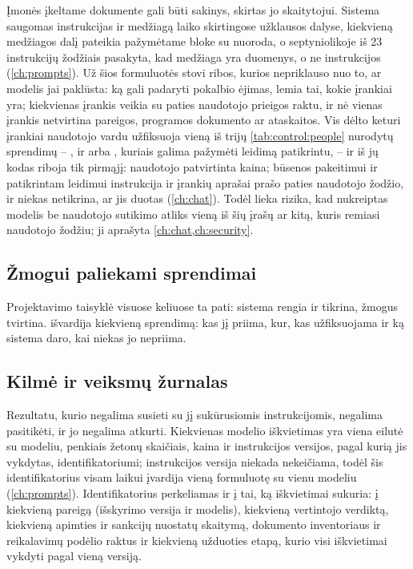 Įmonės įkeltame dokumente gali būti sakinys, skirtas jo skaitytojui. Sistema saugomas
instrukcijas ir medžiagą laiko skirtingose užklausos dalyse, kiekvieną medžiagos dalį
pateikia pažymėtame bloke su nuoroda, o septyniolikoje iš 23 instrukcijų žodžiais pasakyta,
kad medžiaga yra duomenys, o ne instrukcijos (\cref{ch:prompts}). Už šios formuluotės
stovi ribos, kurios nepriklauso nuo to, ar modelis jai paklūsta: ką gali padaryti pokalbio
ėjimas, lemia tai, kokie įrankiai yra; kiekvienas įrankis veikia su paties naudotojo
prieigos raktu, ir nė vienas įrankis netvirtina pareigos, programos dokumento ar ataskaitos.
Vis dėlto keturi įrankiai naudotojo vardu užfiksuoja vieną iš trijų \cref{tab:control:people}
nurodytų sprendimų -- ,  ir
 arba , kuriais galima pažymėti leidimą patikrintu,
-- ir iš jų kodas riboja tik pirmąjį:
naudotojo patvirtinta kaina; būsenos pakeitimui ir patikrintam leidimui instrukcija ir įrankių
aprašai prašo paties naudotojo žodžio, ir niekas netikrina, ar jis duotas (\cref{ch:chat}).
Todėl lieka rizika, kad nukreiptas modelis be
naudotojo sutikimo atliks vieną iš šių įrašų ar kitą, kuris remiasi naudotojo žodžiu; ji
aprašyta \cref{ch:chat,ch:security}.

\subsection{Žmogui paliekami sprendimai}

Projektavimo taisyklė visuose keliuose ta pati: sistema rengia ir tikrina, žmogus tvirtina.
 išvardija kiekvieną sprendimą: kas jį priima, kur, kas
užfiksuojama ir ką sistema daro, kai niekas jo nepriima.

\subsection{Kilmė ir veiksmų žurnalas}\label{sec:control:provenance}

Rezultatu, kurio negalima susieti su jį sukūrusiomis instrukcijomis, negalima pasitikėti, ir
jo negalima atkurti. Kiekvienas modelio iškvietimas yra viena  eilutė su
modeliu, penkiais žetonų skaičiais, kaina ir instrukcijos versijos, pagal kurią jis vykdytas,
identifikatoriumi; instrukcijos versija niekada nekeičiama, todėl šis identifikatorius visam
laikui įvardija vieną formuluotę su vienu modeliu (\cref{ch:prompts}). Identifikatorius
perkeliamas ir į tai, ką iškvietimai sukuria: į kiekvieną pareigą (išskyrimo versija ir
modelis), kiekvieną vertintojo verdiktą, kiekvieną apimties ir sankcijų nuostatų skaitymą,
dokumento inventoriaus ir reikalavimų podėlio raktus ir kiekvieną užduoties etapą, kurio visi
iškvietimai vykdyti pagal vieną versiją.


